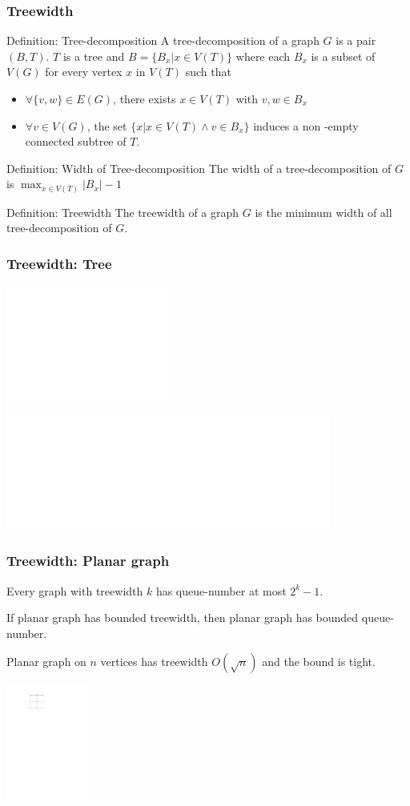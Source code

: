 \documentclass{beamer}
\begin{document}
	\begin{frame}
		\frametitle{Treewidth}
		{
			\begin{block}{Definition: Tree-decomposition}
				A tree-decomposition of a graph $G$ is a pair $(B,T)$. $T$ is a tree and $B = \{B_x | x \in V(T)\}$ where each $B_x$ is a subset of $V(G)$ for every vertex $x$ in $V(T)$ such that
				\begin{itemize}
					\item $\forall \{v,w\} \in E(G)$, there exists $x \in V(T)$ with $v,w \in B_x$
					\item $\forall v \in V(G)$, the set $\{x| x \in V(T) \wedge v \in B_x\}$ induces a non -empty connected subtree of $T$.
				\end{itemize}
			\end{block}
			\begin{block}{Definition: Width of Tree-decomposition}
				The width of a tree-decomposition of $G$ is $\max_{x \in V(T)} |B_x| - 1$
			\end{block}
		}
		{
			\begin{block}{Definition: Treewidth}
				The treewidth of a graph $G$ is the minimum width of all tree-decomposition of $G$. 
			\end{block}
		}
		
	\end{frame}

	\begin{frame}
		\frametitle{Treewidth: Tree}
		\begin{center}
			\includegraphics<1>[width=0.4\textwidth]{pics/treewd_tree_base.pdf}
			\includegraphics<2->[width=0.8\textwidth]{pics/treewd_tree.pdf}
			\vfill
			\onslide<3>{Tree has treewidth 1}
		\end{center}
	\end{frame}

	\begin{frame}
		\frametitle{Treewidth: Planar graph}
		\onslide<1->
		{
			\begin{theorem}[Wiechert,2017]
				Every graph with treewidth $k$ has queue-number at most $2^k-1$.
			\end{theorem}
			\vfill
			If planar graph has bounded treewidth, then planar graph has bounded queue-number.
		}
	
		\onslide<2->
		{
			\vfill
			\begin{theorem}
				Planar graph on $n$ vertices has treewidth $O(\sqrt{n})$ and the bound is tight.
			\end{theorem}
		}
		\onslide<3>
		{
			\begin{center}
				\includegraphics[width=0.2\textwidth]{pics/treewd_grid.pdf}
			\end{center}
		}
		
	\end{frame}
\end{document}

